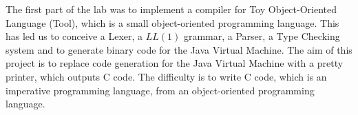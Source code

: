 The first part of the lab was to implement a compiler for Toy Object-Oriented Language (Tool),
which is a small object-oriented programming language.
\newline
This has led us to conceive a Lexer, a \(LL(1)\) grammar, a Parser, a Type Checking system and
to generate binary code for the Java Virtual Machine.
\newline
The aim of this project is to replace code generation for the Java Virtual Machine
with a pretty printer, which outputs C code.
\newline
The difficulty is to write C code, which is an imperative programming language,
from an object-oriented programming language.
